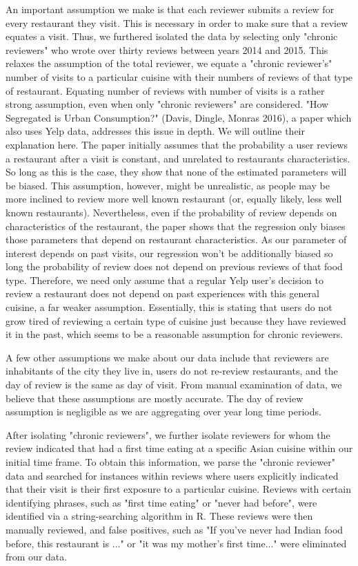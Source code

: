 \documentclass[Journal,letterpaper, NoLineNumbers]{ascelike-new}
\begin{document}
An important assumption we make is that each reviewer submits a review for every restaurant they visit. This is necessary in order to make sure that a review equates a visit. Thus, we furthered isolated the data by selecting only "chronic reviewers" who wrote over thirty reviews between years 2014 and 2015. This relaxes the assumption of the total reviewer, we equate a "chronic reviewer's" number of visits to a particular cuisine with their numbers of reviews of that type of restaurant. 
Equating number of reviews with number of visits is a rather strong assumption, even when only "chronic reviewers" are considered. "How Segregated is Urban Consumption?" (Davis, Dingle, Monras 2016), a paper which also uses Yelp data, addresses this issue in depth. We will outline their explanation here. The paper initially assumes that the probability a user reviews a restaurant after a visit is constant, and unrelated to restaurants characteristics. So long as this is the case, they show that none of the estimated parameters will be biased. This assumption, however, might be unrealistic, as people may be more inclined to review more well known restaurant (or, equally likely, less well known restaurants). Nevertheless, even if the probability of review depends on characteristics of the restaurant, the paper shows that the regression only biases those parameters that depend on restaurant characteristics. As our parameter of interest depends on past visits, our regression won't be additionally biased so long the probability of review does not depend on previous reviews of that food type. Therefore, we need only assume that a regular Yelp user's decision to review a restaurant does not depend on past experiences with this general cuisine, a far weaker assumption. Essentially, this is stating that users do not grow tired of reviewing a certain type of cuisine just because they have reviewed it in the past, which seems to be a reasonable assumption for chronic reviewers.

A few other assumptions we make about our data include that reviewers are inhabitants of the city they live in, users do not re-review restaurants, and the day of review is the same as day of visit. From manual examination of data, we believe that these assumptions are mostly accurate. The day of review assumption is negligible as we are aggregating over year long time periods.

After isolating "chronic reviewers", we further isolate reviewers for whom the review indicated that had a first time eating at a specific Asian cuisine within our initial time frame. To obtain this information, we parse the "chronic reviewer" data and searched for instances within reviews where users explicitly indicated that their visit is their first exposure to a particular cuisine. Reviews with certain identifying phrases, such as "first time eating" or "never had before", were identified via a string-searching algorithm in R. These reviews were then manually reviewed, and false positives, such as "If you've never had Indian food before, this restaurant is ..." or "it was my mother's first time..." were eliminated from our data.
\end{document}
